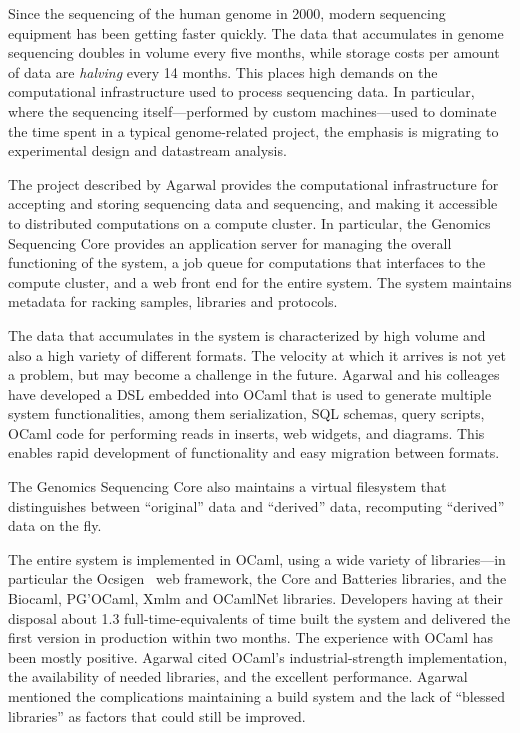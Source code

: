 \documentclass{jfp1}
\begin{document}
Since the sequencing of the human genome in 2000, modern sequencing
equipment has been getting faster quickly.
The data that accumulates in genome sequencing doubles in volume every five months,
while storage costs per amount of data are {\em halving} every 14 months.
This places high demands on the computational infrastructure used to
process sequencing data.  In particular, where the sequencing
itself---performed by custom machines---used to dominate the time
spent in a typical genome-related project, the emphasis is migrating
to experimental design and datastream analysis.

The project described by Agarwal provides the computational
infrastructure for accepting and storing sequencing data and
sequencing, and making it accessible to distributed computations on a
compute cluster.  In particular, the Genomics Sequencing Core provides
an application server for managing the overall functioning of the
system, a job queue for computations that interfaces to the compute
cluster, and a web front end for the entire system.  The system
maintains metadata for racking samples, libraries and protocols.

The data that accumulates in the system is characterized by high
volume and also a high variety of different formats. The
velocity at which it arrives is not yet a problem, but may become a
challenge in the future.  Agarwal and his colleages have developed a
DSL embedded into OCaml that is used to generate multiple
system functionalities, among them serialization, SQL schemas, query scripts,
OCaml code for performing reads in inserts, web widgets, and diagrams.
This enables rapid development of functionality and easy migration
between formats.

The Genomics Sequencing Core also maintains a virtual filesystem that
distinguishes between ``original'' data and ``derived'' data, recomputing ``derived'' data
on the fly.

The entire system is implemented in OCaml, using a wide variety of
libraries---in particular the
Ocsigen~\cite{Balat:2009:ERO:1596550.1596595} web framework, the Core
and Batteries libraries, and the Biocaml, PG'OCaml, Xmlm and OCamlNet
libraries.  Developers having at their disposal about 1.3
full-time-equivalents of time built the system and delivered the
first version in production within two months.  The experience with
OCaml has been mostly positive.  Agarwal cited OCaml's
industrial-strength implementation, the availability of needed
libraries, and the excellent performance.  Agarwal mentioned the
complications maintaining a build system and the lack of ``blessed
libraries'' as factors that could still be improved.
\end{document}
